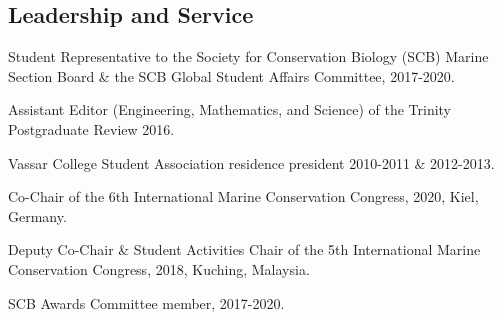 \documentclass[a4paper]{deedy-resume} %
\begin{document}

\newpage %


\sectionspace


\begin{flushleft}

\sectionspace


\section{Leadership and Service} 


\begin{tightitemize}
\item Student Representative to the Society for Conservation Biology (SCB) Marine Section Board \& the SCB Global Student Affairs Committee, 2017-2020. 
\item Assistant Editor (Engineering, Mathematics, and Science) of the Trinity Postgraduate Review 2016.
\item Vassar College Student Association residence president 2010-2011 \& 2012-2013.
\end{tightitemize}

\sectionspace

\begin{tightitemize}
\item Co-Chair of the 6th International Marine Conservation Congress, 2020, Kiel, Germany.
\item Deputy Co-Chair \& Student Activities Chair of the 5th International Marine Conservation Congress, 2018, Kuching, Malaysia.
\item SCB Awards Committee member, 2017-2020.
\end{tightitemize}

\sectionspace





\end{flushleft}
\end{document}
